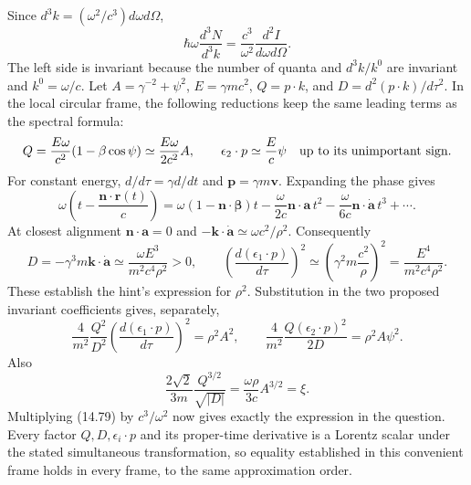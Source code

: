 Since $d^3k=(\omega^2/c^3)d\omega d\Omega$,
\[
\hbar\omega\frac{d^3N}{d^3k}
=\frac{c^3}{\omega^2}\frac{d^2I}{d\omega d\Omega}.
\]
The left side is invariant because the number of quanta and
$d^3k/k^0$ are invariant and $k^0=\omega/c$.
Let $A=\gamma^{-2}+\psi^2$, $E=\gamma mc^2$,
$Q=p\cdot k$, and $D=d^2(p\cdot k)/d\tau^2$.
In the local circular frame, the following reductions keep the same
leading terms as the spectral formula:
\[
Q=\frac{E\omega}{c^2}(1-\beta\cos\psi)
\simeq\frac{E\omega}{2c^2}A,
\qquad
\epsilon_2\cdot p\simeq\frac E c\psi
\quad\hbox{up to its unimportant sign}.
\]
For constant energy, $d/d\tau=\gamma d/dt$ and
$\mathbf p=\gamma m\mathbf v$. Expanding the phase gives
\[
\omega\left(t-\frac{\mathbf n\cdot\mathbf r(t)}c\right)
=\omega(1-\mathbf n\cdot\boldsymbol\beta)t
-\frac{\omega}{2c}\mathbf n\cdot\mathbf a\,t^2
-\frac{\omega}{6c}\mathbf n\cdot\dot{\mathbf a}\,t^3+\cdots.
\]
At closest alignment $\mathbf n\cdot\mathbf a=0$ and
$-\mathbf k\cdot\dot{\mathbf a}\simeq\omega c^2/\rho^2$.
Consequently
\[
D=-\gamma^3m\mathbf k\cdot\dot{\mathbf a}
\simeq\frac{\omega E^3}{m^2c^4\rho^2}>0,
\qquad
\left(\frac{d(\epsilon_1\cdot p)}{d\tau}\right)^2
\simeq\left(\gamma^2m\frac{c^2}{\rho}\right)^2
=\frac{E^4}{m^2c^4\rho^2}.
\]
These establish the hint's expression for $\rho^2$.
Substitution in the two proposed invariant coefficients gives, separately,
\[
\frac4{m^2}\frac{Q^2}{D^2}
\left(\frac{d(\epsilon_1\cdot p)}{d\tau}\right)^2
=\rho^2A^2,
\qquad
\frac4{m^2}\frac{Q(\epsilon_2\cdot p)^2}{2D}
=\rho^2A\psi^2.
\]
Also
\[
\frac{2\sqrt2}{3m}\frac{Q^{3/2}}{\sqrt{|D|}}
=\frac{\omega\rho}{3c}A^{3/2}=\xi.
\]
Multiplying (14.79) by $c^3/\omega^2$ now gives exactly the expression
in the question. Every factor $Q,D,\epsilon_i\cdot p$ and its proper-time
derivative is a Lorentz scalar under the stated simultaneous
transformation, so equality established in this convenient frame holds
in every frame, to the same approximation order.

